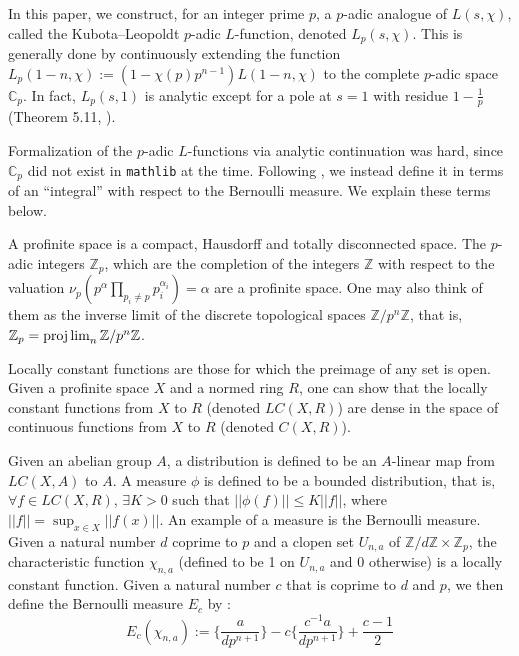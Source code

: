 \documentclass[a4paper,UKenglish,cleveref, autoref, thm-restate,pdfa]{lipics-v2021}
\newcommand{\lean}[1]{\texttt{#1}\xspace} %
\begin{document}
In this paper, we construct, for an integer prime $p$, a $p$-adic analogue of $L(s, \chi)$, 
called the Kubota--Leopoldt $p$-adic $L$-function, denoted $L_p(s, \chi)$. This is generally done by continuously extending the function 
$L_p(1 - n, \chi) := (1 - \chi (p) p^{n - 1}) L(1 - n, \chi)$ to the complete $p$-adic space 
$\mathbb{C}_p$. In fact, $L_p(s, 1)$ is analytic except for a pole at $s = 1$ with residue 
$1 - \frac{1}{p}$ (Theorem 5.11, \cite{cyc}). 

Formalization of the $p$-adic $L$-functions via analytic continuation was hard, since $\mathbb{C}_p$ did not exist 
in \lean{mathlib} at the time. Following \cite{cyc}, 
we instead define it in terms of an ``integral'' with respect to the Bernoulli measure. We explain these terms below. 

A profinite space is a compact, Hausdorff and totally disconnected space. The $p$-adic integers 
$\mathbb{Z}_p$, which are the completion of the integers $\mathbb{Z}$ with respect to the 
valuation $\nu_p(p^{\alpha} \prod_{p_i \ne p} p_i^{\alpha_i}) = \alpha$ are a profinite space. 
One may also think of them as the inverse limit of the discrete topological spaces 
$\mathbb{Z} / p^{n} \mathbb{Z}$, that is, $\mathbb{Z}_p = \projlim_{n} \mathbb{Z} / p^{n} \mathbb{Z}$. 

Locally constant functions are those for which the preimage of any set is open. Given a profinite space $X$ and a normed ring $R$, 
one can show that the locally constant functions from $X$ to $R$ (denoted $LC(X, R)$) are dense in the space of continuous 
functions from $X$ to $R$ (denoted $C(X, R)$).

Given an abelian group $A$, a distribution is defined to be an $A$-linear map from $LC(X, A)$ 
to $A$. A measure $\phi$ is defined to be a bounded distribution, that is, $\forall f \in LC(X, R)$, 
$\exists K > 0$ such that $|| \phi (f) || \le K ||f|| $, where $||f|| = \sup_{x \in X} || f(x)||$. 
An example of a measure is the Bernoulli measure. Given a natural number $d$ coprime to $p$ and a clopen set $U_{n, a}$ of 
$\mathbb{Z}/ d \mathbb{Z} \times \mathbb{Z}_p$, the characteristic function $\chi_{n, a}$ 
(defined to be 1 on $U_{n, a}$ and 0 otherwise) is a locally constant function. 
Given a natural number $c$ that is coprime to $d$ and $p$, we then define the Bernoulli measure $E_c$ by :
$$ E_c(\chi_{n, a}) := \bigg \{ \frac{a}{d p^{n + 1}} \bigg \} - c \bigg \{ \frac{c^{-1} a}{d p^{n + 1}} \bigg \} + \frac{c - 1}{2} $$
\end{document}
